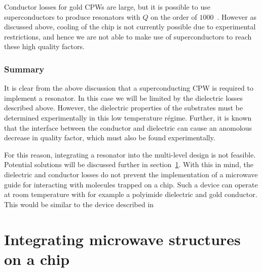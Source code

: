 Conductor losses for gold CPWs are large, but it is possible to use
superconductors to produce resonators with $Q$ on the order of
$1000$~\cite{Booth1999, Wallraff2004}. 
However as discussed above, cooling of the chip is not currently possible due
to experimental restrictions, and hence we are not able to make use of
superconductors to reach these high quality factors.

\subsubsection{Summary}

It is clear from the above discussion that a superconducting CPW is required to
implement a resonator. In this case we will be limited by the dielectric losses
described above. However, the dielectric properties of the substrates must be
determined experimentally in this low temperature r\'egime. Further, it is
known that the interface between the conductor and dielectric can cause an
anomolous decrease in quality factor, which must also be found experimentally.

For this reason, integrating a resonator into the multi-level design is not
feasible. Potential solutions will be discussed further in
section~\ref{mws:integrating}. With this in mind, the dielectric and conductor
losses do not prevent the implementation of a microwave guide for interacting
with molecules trapped on a chip. Such a device can operate at room temperature
with for example a polyimide dielectric and gold conductor. This would be
similar to the device described in 




\section{Integrating microwave structures on a chip}
\label{mws:integrating}


